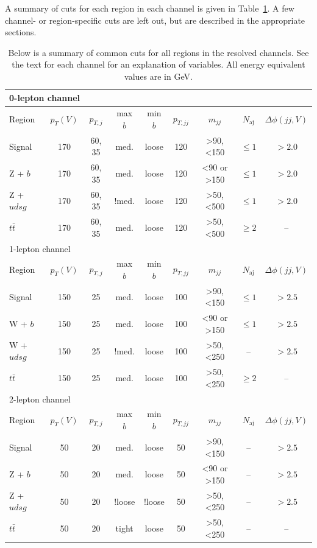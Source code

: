 A summary of cuts for each region in each channel
is given in Table~\ref{tab:resolved}.
A few channel- or region-specific cuts are left out,
but are described in the appropriate sections.
\begin{table}
  \centering
  \caption[Summary of resolved selection cuts]{
    Below is a summary of common cuts for all regions in the resolved channels.
    See the text for each channel for an explanation of variables.
    All energy equivalent values are in GeV.
  }
  \begin{tabular}{|l|c|c|c|c|c|c|c|c|}
    \hline
    \multicolumn{9}{|l|}{0-lepton channel} \\
    \hline
    Region & $p_T(V)$ & $p_{T,j}$ & max $b$ & min $b$ & $p_{T,jj}$ & $m_{jj}$ & $N_\textrm{aj}$ & $\Delta\phi(jj, V)$ \\
    \hline
    Signal & 170 & 60, 35 & med. & loose & 120 & >90, <150 & $\le 1$ & $> 2.0$ \\
    Z + $b$ & 170 & 60, 35 & med. & loose & 120 & <90 or >150 & $\le 1$ & $> 2.0$ \\
    Z + $udsg$ & 170 & 60, 35 & !med. & loose & 120 & >50, <500 & $\le 1$ & $> 2.0$ \\
    $t\bar{t}$ & 170 & 60, 35 & med. & loose & 120 & >50, <500 & $\ge 2$ & -- \\
    \hline
    \hline
    \multicolumn{9}{|l|}{1-lepton channel} \\
    \hline
    Region & $p_T(V)$ & $p_{T,j}$ & max $b$ & min $b$ & $p_{T,jj}$ & $m_{jj}$ & $N_\textrm{aj}$ & $\Delta\phi(jj, V)$ \\
    \hline
    Signal & 150 & 25 & med. & loose & 100 & >90, <150 & $\le 1$ & $> 2.5$ \\
    W + $b$ & 150 & 25 & med. & loose & 100 & <90 or >150 & $\le 1$ & $> 2.5$ \\
    W + $udsg$ & 150 & 25 & !med. & loose & 100 & >50, <250 & -- & $> 2.5$ \\
    $t\bar{t}$ & 150 & 25 & med. & loose & 100 & >50, <250 & $\ge 2$ & -- \\
    \hline
    \hline
    \multicolumn{9}{|l|}{2-lepton channel} \\
    \hline
    Region & $p_T(V)$ & $p_{T,j}$ & max $b$ & min $b$ & $p_{T,jj}$ & $m_{jj}$ & $N_\textrm{aj}$ & $\Delta\phi(jj, V)$ \\
    \hline
    Signal & 50 & 20 & med. & loose & 50 & >90, <150 & -- & $> 2.5$ \\
    Z + $b$ & 50 & 20 & med. & loose & 50 & <90 or >150 & -- & $> 2.5$ \\
    Z + $udsg$ & 50 & 20 & !loose & !loose & 50 & >50, <250 & -- & $> 2.5$ \\
    $t\bar{t}$ & 50 & 20 & tight & loose & 50 & >50, <250 & -- & -- \\
    \hline
  \end{tabular}
  \label{tab:resolved}
\end{table}
